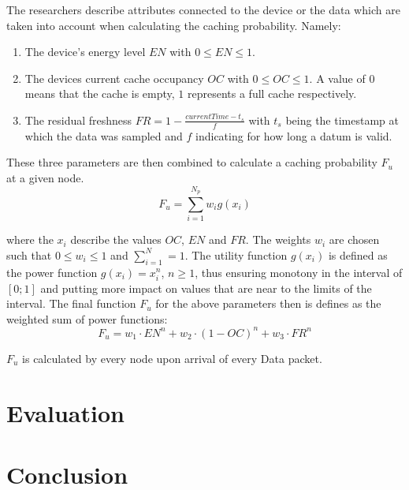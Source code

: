 \documentclass[conference]{IEEEtran}
\begin{document}
The researchers describe attributes connected to the device or the data which are taken into account when calculating the caching probability. Namely:
\begin{enumerate}
	\item The device's energy level $EN$ with $0 \leq EN \leq 1$.
	\item The devices current cache occupancy $OC$ with $0 \leq OC \leq 1$. A value of $0$ means that the cache is empty, $1$ represents a full cache respectively.
	\item The residual freshness $FR = 1 - \frac{currentTime - t_s}{f}$ with $t_s$ being the timestamp at which the data was sampled and $f$ indicating for how long a datum is valid.
\end{enumerate} 

These three parameters are then combined to calculate a caching probability $F_u$ at a given node.
\begin{equation}
	F_u = \sum_{i = 1}^{N_p} w_i g(x_i)
\end{equation}

where the $x_i$ describe the values $OC$, $EN$ and $FR$. The weights $w_i$ are chosen such that $0 \leq w_i \leq 1$ and $\sum_{i = 1}^{N} = 1$. The utility function $g(x_i)$ is defined as the power function $g(x_i) = x_i^n$, $n \geq 1$, thus ensuring monotony in the interval of $[0; 1]$ and putting more impact on values that are near to the limits of the interval. The final function $F_u$ for the above parameters then is defines as the weighted sum of power functions:
\begin{equation}
	F_u = w_1 \cdot EN^n + w_2 \cdot (1 - OC)^n + w_3 \cdot FR^n
\end{equation}

$F_u$ is calculated by every node upon arrival of every Data packet.

\section{Evaluation}
\label{sec:eval}

\section{Conclusion}
\label{sec:conclusion}

\printbibliography
\end{document}
